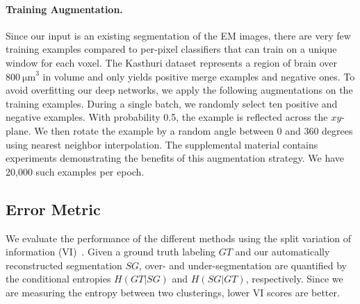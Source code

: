 \paragraph{Training Augmentation.}

Since our input is an existing segmentation of the EM images, there are very few training examples compared to per-pixel classifiers that can train on a unique window for each voxel. 
The Kasthuri dataset represents a region of brain over $\SI[product-units=single]{800}{\micro\meter}^3$ in volume and only yields  positive merge examples and  negative ones.
To avoid overfitting our deep networks, we apply the following augmentations on the training examples.
During a single batch, we randomly select ten positive and negative examples. 
With probability 0.5, the example is reflected across the $xy$-plane. 
We then rotate the example by a random angle between $0$ and $360$ degrees using nearest neighbor interpolation. 
The supplemental material contains experiments demonstrating the benefits of this augmentation strategy.
We have 20,000 such examples per epoch.


\subsection{Error Metric}
\label{sec:variation-of-information}

We evaluate the performance of the different methods using the split variation of information (VI)~\cite{meila2003comparing}.
Given a ground truth labeling $GT$ and our automatically reconstructed segmentation $SG$, over- and under-segmentation are quantified by the conditional entropies $H(GT | SG)$ and $H(SG | GT)$, respectively. 
Since we are measuring the entropy between two clusterings, lower VI scores are better.
